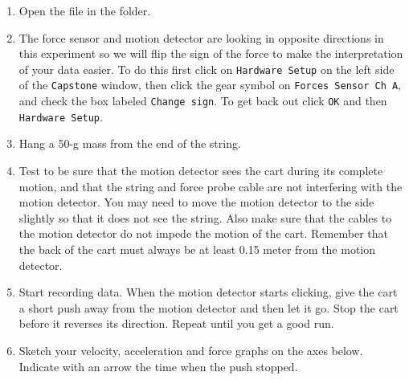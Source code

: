 \begin{enumerate}
\item Open the file  in the \filename{\coursefolder} folder.

\item The force sensor and motion detector are looking in opposite directions in this experiment
so we will flip the sign of the force to make the interpretation of your data easier.
To do this  first click on {\tt Hardware Setup} on the left
side of the {\tt Capstone} window, then click the gear symbol on {\tt Forces Sensor Ch A},
and check the box labeled {\tt Change sign}.
To get back out click {\tt OK} and then {\tt Hardware Setup}.


\item Hang a 50-g mass from the end of the string.
\item Test to be sure that the motion detector sees the cart during its complete motion,
and that the string and force probe cable are not interfering with the motion
detector. You may need to move the motion detector to the side slightly so that
it does not see the string. Also make sure that the cables to the motion detector
do not impede the motion of the cart. Remember that the back of the cart must
always be at least 0.15 meter from the motion detector. 
\item Start recording data. When the motion detector starts clicking, give the cart
a short push away from the motion detector and then let it go. Stop the cart
before it reverses its direction. Repeat until you get a good run. 
\item Sketch your velocity, acceleration and force graphs on the axes below. 
Indicate with an arrow the time when the push
stopped.
\end{enumerate}

